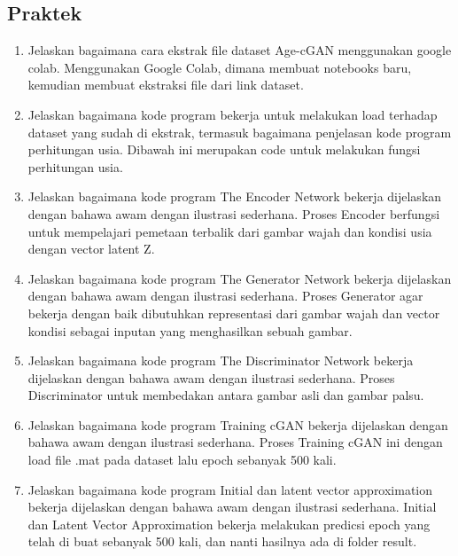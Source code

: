 \subsection{Praktek}
\begin{enumerate}
\item Jelaskan bagaimana cara ekstrak ﬁle dataset Age-cGAN menggunakan google colab.
Menggunakan Google Colab, dimana membuat notebooks baru, kemudian membuat ekstraksi file dari link dataset.




\item Jelaskan bagaimana kode program bekerja untuk melakukan load terhadap dataset yang sudah di ekstrak, termasuk bagaimana penjelasan kode program perhitungan usia.
Dibawah ini merupakan code untuk melakukan fungsi perhitungan usia.



	\item Jelaskan bagaimana kode program The Encoder Network bekerja dijelaskan dengan bahawa awam dengan ilustrasi sederhana.
Proses Encoder berfungsi untuk mempelajari pemetaan terbalik dari gambar wajah dan kondisi usia dengan vector latent Z.

		

	\item Jelaskan bagaimana kode program The Generator Network bekerja dijelaskan dengan bahawa awam dengan ilustrasi sederhana.
Proses Generator agar bekerja dengan baik dibutuhkan representasi dari gambar wajah dan vector kondisi sebagai inputan yang menghasilkan sebuah gambar.

		

        	\item Jelaskan bagaimana kode program The Discriminator Network bekerja dijelaskan dengan bahawa awam dengan ilustrasi sederhana.
Proses Discriminator untuk membedakan antara gambar asli dan gambar palsu.

		

        	\item Jelaskan bagaimana kode program Training cGAN bekerja dijelaskan dengan bahawa awam dengan ilustrasi sederhana.
Proses Training cGAN ini dengan load file .mat pada dataset lalu epoch sebanyak 500 kali.

		

        	\item Jelaskan bagaimana kode program Initial dan latent vector approximation bekerja dijelaskan dengan bahawa awam dengan ilustrasi sederhana.
Initial dan Latent Vector Approximation bekerja melakukan predicsi epoch yang telah di buat sebanyak 500 kali, dan nanti hasilnya ada di folder result.

		
\end{enumerate}

